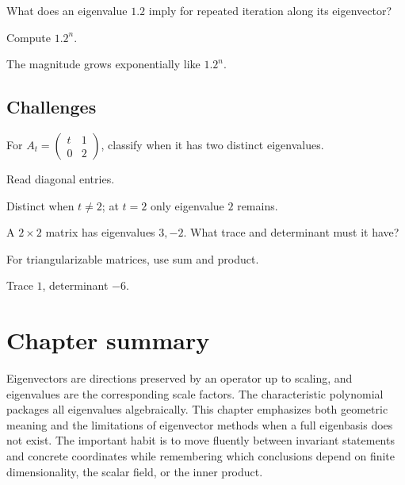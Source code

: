 \begin{exercise}\label{exr:i09-expand-14}
What does an eigenvalue \(1.2\) imply for repeated iteration along its eigenvector?
\end{exercise}
\begin{hint}
Compute \(1.2^n\).
\end{hint}
\begin{solution}
The magnitude grows exponentially like \(1.2^n\).
\end{solution}

\subsection*{Challenges}

\begin{exercise}\label{exr:i09-expand-15}
For \(A_t=\begin{pmatrix}t&1\\0&2\end{pmatrix}\), classify when it has two distinct eigenvalues.
\end{exercise}
\begin{hint}
Read diagonal entries.
\end{hint}
\begin{solution}
Distinct when \(t\neq2\); at \(t=2\) only eigenvalue \(2\) remains.
\end{solution}

\begin{exercise}\label{exr:i09-expand-16}
A \(2\times2\) matrix has eigenvalues \(3,-2\). What trace and determinant must it have?
\end{exercise}
\begin{hint}
For triangularizable matrices, use sum and product.
\end{hint}
\begin{solution}
Trace \(1\), determinant \(-6\).
\end{solution}
\section*{Chapter summary}
Eigenvectors are directions preserved by an operator up to scaling, and eigenvalues are the corresponding scale factors. The characteristic polynomial packages all eigenvalues algebraically. This chapter emphasizes both geometric meaning and the limitations of eigenvector methods when a full eigenbasis does not exist.
The important habit is to move fluently between invariant statements and concrete coordinates while remembering which conclusions depend on finite dimensionality, the scalar field, or the inner product.
